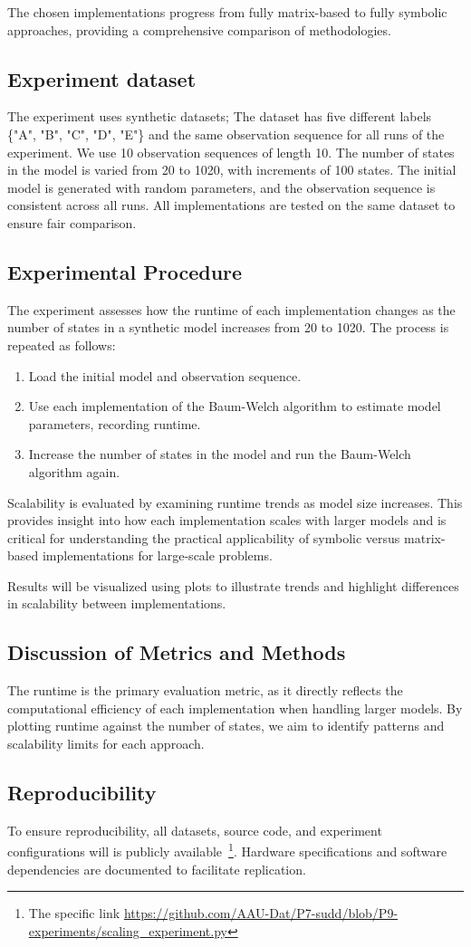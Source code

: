 The chosen implementations progress from fully matrix-based to fully symbolic approaches, providing a comprehensive comparison of methodologies.

\subsection{Experiment dataset}
The experiment uses synthetic datasets; The dataset has five different labels \{"A", "B", "C", "D", "E"\} and the same observation sequence for all runs of the experiment. 
We use 10 observation sequences of length 10.
The number of states in the model is varied from 20 to 1020, with increments of 100 states.
The initial model is generated with random parameters, and the observation sequence is consistent across all runs.
All implementations are tested on the same dataset to ensure fair comparison.

\subsection{Experimental Procedure}
The experiment assesses how the runtime of each implementation changes as the number of states in a synthetic model increases from 20 to 1020. 
The process is repeated as follows:

\begin{enumerate}
\item Load the initial model and observation sequence.
\item Use each implementation of the Baum-Welch algorithm to estimate model parameters, recording runtime.
\item Increase the number of states in the model and run the Baum-Welch algorithm again.
\end{enumerate}

Scalability is evaluated by examining runtime trends as model size increases.
This provides insight into how each implementation scales with larger models and is critical for understanding the practical applicability of symbolic versus matrix-based implementations for large-scale problems.

Results will be visualized using plots to illustrate trends and highlight differences in scalability between implementations.

\subsection{Discussion of Metrics and Methods}
The runtime is the primary evaluation metric, as it directly reflects the computational efficiency of each implementation when handling larger models. By plotting runtime against the number of states, we aim to identify patterns and scalability limits for each approach.

\subsection{Reproducibility}
To ensure reproducibility, all datasets, source code, and experiment configurations will is publicly available~\cite{p7}\footnote{The specific link \url{https://github.com/AAU-Dat/P7-sudd/blob/P9-experiments/scaling_experiment.py}}. 
Hardware specifications and software dependencies are documented to facilitate replication.
